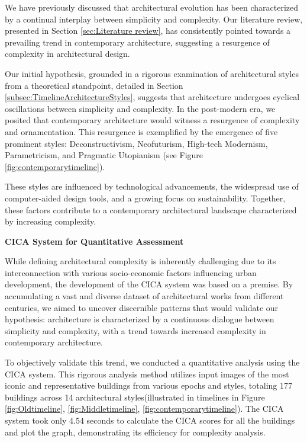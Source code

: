 %    

We have previously discussed that architectural evolution has been characterized by a continual interplay between simplicity and complexity.
Our literature review, presented in Section \ref{sec:Literature review}, has consistently pointed towards a prevailing trend in contemporary architecture, suggesting a resurgence of complexity in architectural design.

Our initial hypothesis, grounded in a rigorous examination of architectural styles from a theoretical standpoint, detailed in Section \ref{subsec:TimelineArchitectureStyles}, suggests that architecture undergoes cyclical oscillations between simplicity and complexity.
In the post-modern era, we posited that contemporary architecture would witness a resurgence of complexity and ornamentation.
This resurgence is exemplified by the emergence of five prominent styles: Deconstructivism, Neofuturism, High-tech Modernism, Parametricism, and Pragmatic Utopianism (see Figure \ref{fig:contemporarytimeline}).

These styles are influenced by technological advancements, the widespread use of computer-aided design tools, and a growing focus on sustainability.
Together, these factors contribute to a contemporary architectural landscape characterized by increasing complexity.

\textbf{CICA System for Quantitative Assessment}

While defining architectural complexity is inherently challenging due to its interconnection with various socio-economic factors influencing urban development, the development of the CICA system was based on a premise.
By accumulating a vast and diverse dataset of architectural works from different centuries, we aimed to uncover discernible patterns that would validate our hypothesis: architecture is characterized by a continuous dialogue between simplicity and complexity, with a trend towards increased complexity in contemporary architecture.

To objectively validate this trend, we conducted a quantitative analysis using the CICA system.
This rigorous analysis method utilizes input images of the most iconic and representative buildings from various epochs and styles, totaling 177 buildings across 14 architectural styles(illustrated in timelines in Figure \ref{fig:Oldtimeline}, \ref{fig:Middletimeline}, \ref{fig:contemporarytimeline}).
The CICA system took only 4.54 seconds to calculate the CICA scores for all the buildings and plot the graph, demonstrating its efficiency for complexity analysis.

